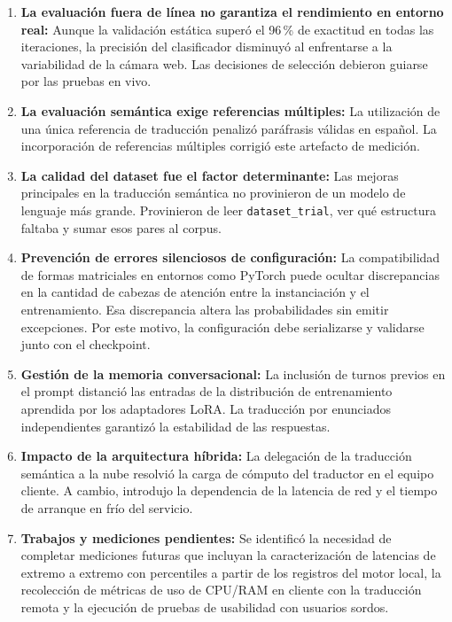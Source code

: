 \begin{enumerate}
    \item \textbf{La evaluación fuera de línea no garantiza el rendimiento en entorno real:} Aunque la validación estática superó el 96\,\% de exactitud en todas las iteraciones, la precisión del clasificador disminuyó al enfrentarse a la variabilidad de la cámara web. Las decisiones de selección debieron guiarse por las pruebas en vivo.
    \item \textbf{La evaluación semántica exige referencias múltiples:} La utilización de una única referencia de traducción penalizó paráfrasis válidas en español. La incorporación de referencias múltiples corrigió este artefacto de medición.
    \item \textbf{La calidad del dataset fue el factor determinante:} Las mejoras principales en la traducción semántica no provinieron de un modelo de lenguaje más grande. Provinieron de leer \texttt{dataset\_trial}, ver qué estructura faltaba y sumar esos pares al corpus.
    \item \textbf{Prevención de errores silenciosos de configuración:} La compatibilidad de formas matriciales en entornos como PyTorch puede ocultar discrepancias en la cantidad de cabezas de atención entre la instanciación y el entrenamiento. Esa discrepancia altera las probabilidades sin emitir excepciones. Por este motivo, la configuración debe serializarse y validarse junto con el checkpoint.
    \item \textbf{Gestión de la memoria conversacional:} La inclusión de turnos previos en el prompt distanció las entradas de la distribución de entrenamiento aprendida por los adaptadores LoRA. La traducción por enunciados independientes garantizó la estabilidad de las respuestas.
    \item \textbf{Impacto de la arquitectura híbrida:} La delegación de la traducción semántica a la nube resolvió la carga de cómputo del traductor en el equipo cliente. A cambio, introdujo la dependencia de la latencia de red y el tiempo de arranque en frío del servicio.
    \item \textbf{Trabajos y mediciones pendientes:} Se identificó la necesidad de completar mediciones futuras que incluyan la caracterización de latencias de extremo a extremo con percentiles a partir de los registros del motor local, la recolección de métricas de uso de CPU/RAM en cliente con la traducción remota y la ejecución de pruebas de usabilidad con usuarios sordos.
\end{enumerate}
